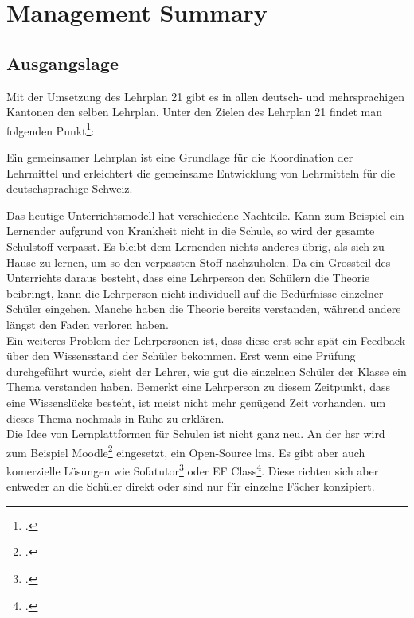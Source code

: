\section{Management Summary}

\subsection{Ausgangslage}
Mit der Umsetzung des Lehrplan 21 gibt es in allen deutsch- und mehrsprachigen Kantonen den selben Lehrplan. Unter den Zielen des Lehrplan 21 findet man folgenden Punkt\footcite{lp21_ziel}:

\begin{displayquote}
Ein gemeinsamer Lehrplan ist eine Grundlage für die Koordination der Lehrmittel und erleichtert die gemeinsame Entwicklung von Lehrmitteln für die deutschsprachige Schweiz.
\end{displayquote}

Das heutige Unterrichtsmodell hat verschiedene Nachteile. Kann zum Beispiel ein Lernender aufgrund von Krankheit nicht in die Schule, so wird der gesamte Schulstoff verpasst. Es bleibt dem Lernenden nichts anderes übrig, als sich zu Hause zu lernen, um so den verpassten Stoff nachzuholen. Da ein Grossteil des Unterrichts daraus besteht, dass eine Lehrperson den Schülern die Theorie beibringt, kann die Lehrperson nicht individuell auf die Bedürfnisse einzelner Schüler eingehen. Manche haben die Theorie bereits verstanden, während andere längst den Faden verloren haben. \\

Ein weiteres Problem der Lehrpersonen ist, dass diese erst sehr spät ein Feedback über den Wissensstand der Schüler bekommen. Erst wenn eine Prüfung durchgeführt wurde, sieht der Lehrer, wie gut die einzelnen Schüler der Klasse ein Thema verstanden haben. Bemerkt eine Lehrperson zu diesem Zeitpunkt, dass eine Wissenslücke besteht, ist meist nicht mehr genügend Zeit vorhanden, um dieses Thema nochmals in Ruhe zu erklären. \\


Die Idee von Lernplattformen für Schulen ist nicht ganz neu. An der \gls{hsr} wird zum Beispiel Moodle\footcite{moodle_homepage} eingesetzt, ein Open-Source \gls{lms}. Es gibt aber auch komerzielle Lösungen wie Sofatutor\footcite{sofatutor_homepage} oder EF Class\footcite{ef_class_homepage}. Diese richten sich aber entweder an die Schüler direkt oder sind nur für einzelne Fächer konzipiert. \\

